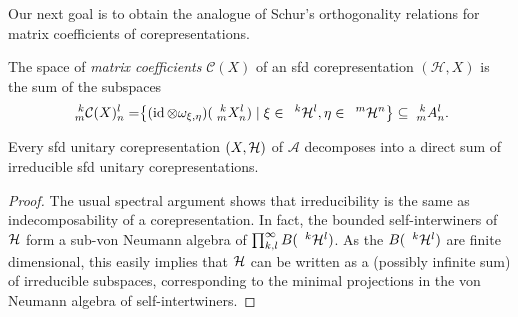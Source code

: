 Our next goal is to obtain the analogue of Schur's orthogonality
relations for matrix coefficients of corepresentations.

\begin{Def} The space of \emph{matrix coefficients} $\mathcal{C}(X)$ of an sfd corepresentation $(\mathcal{H},X)$ is the sum of
the subspaces
\begin{align*}
  \Gr{\mathcal{C}(X)}{k}{l}{m}{n} &= \span \left\{ (\id \otimes
  \omega_{\xi,\eta})(\Gr{X}{k}{l}{m}{n}) \mid \xi \in
  \Gru{\mathcal{H}}{k}{l}, \eta \in \Gru{\mathcal{H}}{m}{n} \right\}
\subseteq \Gr{A}{k}{l}{m}{n}.
\end{align*}
\end{Def}

\begin{Lem} Every sfd unitary corepresentation $(X,\mathcal{H})$ of $\mathscr{A}$ decomposes into a direct sum of irreducible sfd unitary corepresentations.
\end{Lem} 
\begin{proof} The usual spectral argument shows that irreducibility is the same as indecomposability of a corepresentation. In fact, the bounded self-interwiners of $\mathcal{H}$ form a sub-von Neumann algebra of $\prod_{k,l}^{\infty} B(\;{}^{\;k}\mathcal{H}^{l})$. As the $B(\;{}^{\;k}\mathcal{H}^{l})$ are finite dimensional, this easily implies that $\mathcal{H}$ can be written as a (possibly infinite sum) of irreducible subspaces, corresponding to the minimal projections in the von Neumann algebra of self-intertwiners.%
\end{proof} 

